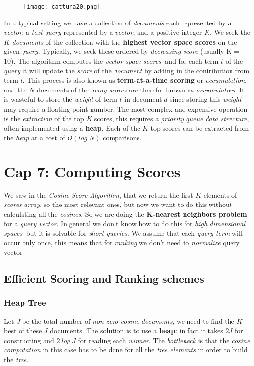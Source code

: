 \documentclass{article}
\begin{document}
\begin{figure}[H]
  \centering
  \texttt{[image: cattura20.png]}
\end{figure}
In a typical setting we have a collection of \emph{documents} each represented by a \emph{vector}, a \emph{text query} represented by a \emph{vector}, and a positive integer $K$. We seek the $K$ \emph{documents} of the collection with the \textbf{highest vector space scores} on the given \emph{query}. Typically, we seek these ordered by \emph{decreasing score} (usually K = 10). The algorithm computes the \emph{vector space scores}, and for each term $t$ of the \emph{query} it will update the \emph{score} of the \emph{document} by adding in the contribution from term $t$. This process is also known as \textbf{term-at-a-time scoring} or \emph{accumulation}, and the $N$ documents of the \emph{array scores} are therefor known as \emph{accumulators}.  It is wasteful to store the \emph{weight} of term $t$ in document $d$ since storing this \emph{weight} may require a floating point number. The most complex and expensive operation is the \emph{extraction} of the top $K$ scores, this requires a \emph{priority queue data structure}, often implemented using a \textbf{heap}. Each of the $K$ top scores can be extracted from the \emph{heap} at a cost of $O(log\; N)$ comparisons.
\section{Cap 7: Computing Scores}
We saw in the \emph{Cosine Score Algorithm}, that we return the first $K$ elements of \emph{scores array}, so the most relevant ones, but now we want to do this without calculating all the \emph{cosines}. So we are doing the\textbf{ K-nearest neighbors problem} for a \emph{query vector}. In general we don't know how to do this for \emph{high dimensional spaces}, but it is solvable for \emph{short queries}. We assume that each \emph{query term} will occur only once, this means that for \emph{ranking} we don't need to \emph{normalize} query vector. 
\subsection{Efficient Scoring and Ranking schemes}
\subsubsection{Heap Tree}
Let $J$ be the total number of \emph{non-zero cosine documents}, we need to find the $K$ best of these $J$ documents. The solution is to use a \textbf{heap}: in fact it takes $2J$ for constructing and $2\: log\; J$ for reading each \emph{winner}. The \emph{bottleneck} is that the \emph{cosine computation} in this case has to be done for all the \emph{tree elements} in order to build the \emph{tree}. 
\end{document}
